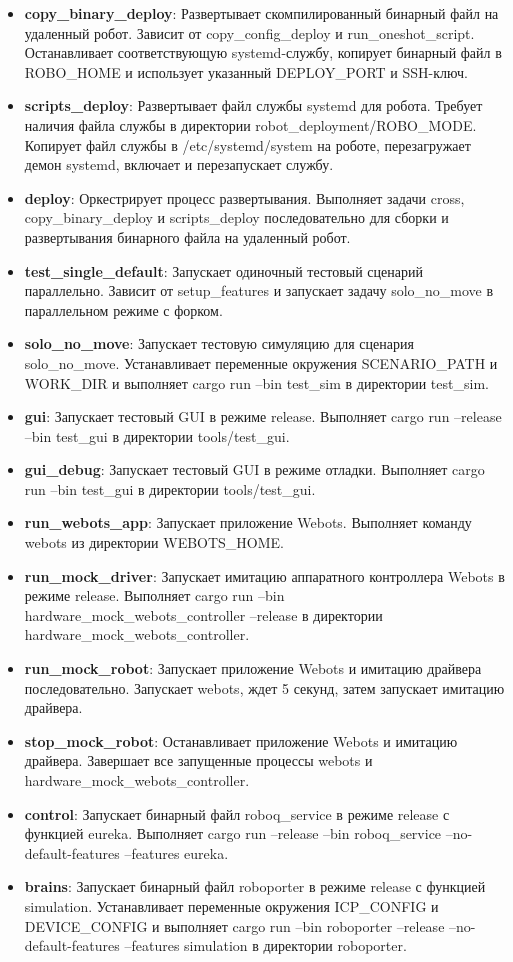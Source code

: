 \begin{itemize}
    \item \textbf{copy\_binary\_deploy}: Развертывает скомпилированный бинарный файл на удаленный робот. Зависит от copy\_config\_deploy и run\_oneshot\_script. Останавливает соответствующую systemd-службу, копирует бинарный файл в ROBO\_HOME и использует указанный DEPLOY\_PORT и SSH-ключ.
    \item \textbf{scripts\_deploy}: Развертывает файл службы systemd для робота. Требует наличия файла службы в директории robot\_deployment/ROBO\_MODE. Копирует файл службы в /etc/systemd/system на роботе, перезагружает демон systemd, включает и перезапускает службу.
    \item \textbf{deploy}: Оркестрирует процесс развертывания. Выполняет задачи cross, copy\_binary\_deploy и scripts\_deploy последовательно для сборки и развертывания бинарного файла на удаленный робот.
    \item \textbf{test\_single\_default}: Запускает одиночный тестовый сценарий параллельно. Зависит от setup\_features и запускает задачу solo\_no\_move в параллельном режиме с форком.
    \item \textbf{solo\_no\_move}: Запускает тестовую симуляцию для сценария solo\_no\_move. Устанавливает переменные окружения SCENARIO\_PATH и WORK\_DIR и выполняет cargo run --bin test\_sim в директории test\_sim.
    \item \textbf{gui}: Запускает тестовый GUI в режиме release. Выполняет cargo run --release --bin test\_gui в директории tools/test\_gui.
    \item \textbf{gui\_debug}: Запускает тестовый GUI в режиме отладки. Выполняет cargo run --bin test\_gui в директории tools/test\_gui.
    \item \textbf{run\_webots\_app}: Запускает приложение Webots. Выполняет команду webots из директории WEBOTS\_HOME.
    \item \textbf{run\_mock\_driver}: Запускает имитацию аппаратного контроллера Webots в режиме release. Выполняет cargo run --bin hardware\_mock\_webots\_controller --release в директории hardware\_mock\_webots\_controller.
    \item \textbf{run\_mock\_robot}: Запускает приложение Webots и имитацию драйвера последовательно. Запускает webots, ждет 5 секунд, затем запускает имитацию драйвера.
    \item \textbf{stop\_mock\_robot}: Останавливает приложение Webots и имитацию драйвера. Завершает все запущенные процессы webots и hardware\_mock\_webots\_controller.
    \item \textbf{control}: Запускает бинарный файл roboq\_service в режиме release с функцией eureka. Выполняет cargo run --release --bin roboq\_service --no-default-features --features eureka.
    \item \textbf{brains}: Запускает бинарный файл roboporter в режиме release с функцией simulation. Устанавливает переменные окружения ICP\_CONFIG и DEVICE\_CONFIG и выполняет cargo run --bin roboporter --release --no-default-features --features simulation в директории roboporter.
\end{itemize}
